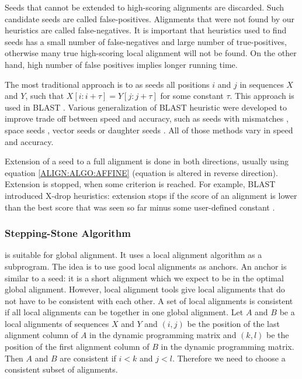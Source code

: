 Seeds that cannot be extended to high-scoring alignments are
discarded. Such candidate seeds are called false-positives.
Alignments that were not found by our heuristics
are called false-negatives.
It is important that heuristics used to find seeds has a small number of
false-negatives and large number of true-positives,
otherwise many true high-scoring local alignment will not be found. On the other
hand, high number of false positives implies longer running time. 


The most traditional approach is to as seeds all positions $i$ and $j$ in
sequences $X$ and $Y$, such that $X[i:i+\tau]=Y[j:j+\tau]$ for some constant
$\tau$. This approach is used in BLAST \cite{Altschul1990}.  Various
generalization of BLAST heuristic were developed to improve trade off between
speed and accuracy, such as seeds with mismatches \cite{Kent2002}, space seeds
\cite{Ma2002}, vector seeds \cite{Brejova2005vector} or daughter seeds
\cite{Csuros2005}. All of those methods vary in speed and accuracy.

Extension of a seed to a full alignment is done in both directions, usually
using equation \ref{ALIGN:ALGO:AFFINE} (equation is altered in reverse
direction). Extension is stopped, when some criterion is reached. For example,
BLAST introduced X-drop heuristics: extension stops if the score of an alignment
is lower than the best score that was seen so far minus some user-defined
constant \cite{Altschul1997}.

\subsubsection{Stepping-Stone Algorithm}
\label{SECTION:SSA}

\cite{Meyer2002,Pairagon2009} is suitable for global alignment. It uses
a local alignment algorithm as a subprogram. The idea is to use good local
alignments as anchors. An anchor is similar to a seed: it is a short alignment which we
expect to be in the optimal global alignment.  However, local alignment tools
give local alignments that do not have to be consistent with each other. A set of
local alignments is consistent if all local alignments can be together in one
global alignment. Let $A$ and $B$ be a local alignments of sequences $X$ and
$Y$ and $(i,j)$ be the position of the last alignment column of $A$ in the dynamic
programming matrix and $(k,l)$ be the position of the first alignment column of
$B$ in the dynamic programming matrix. Then $A$ and $B$ are consistent if $i<k$
and $j<l$.
Therefore we need to choose a consistent subset of alignments.


